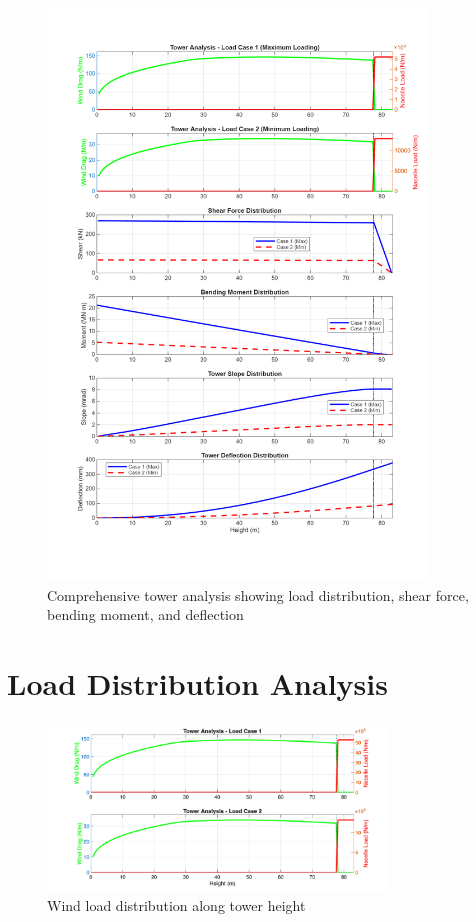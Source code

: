 \documentclass[12pt]{article}
\begin{document}
\begin{figure}[H]
    \centering
    \includegraphics[width=0.9\textwidth]{PNGS/Tower_Analysis_Complete.png}
    \caption{Comprehensive tower analysis showing load distribution, shear force, bending moment, and deflection}
    \label{fig:comprehensive}
\end{figure}

\section{Load Distribution Analysis}

\begin{figure}[H]
    \centering
    \includegraphics[width=0.8\textwidth]{PNGS/Tower_Load_Distribution.png}
    \caption{Wind load distribution along tower height}
    \label{fig:load_dist}
\end{figure}
\end{document}
